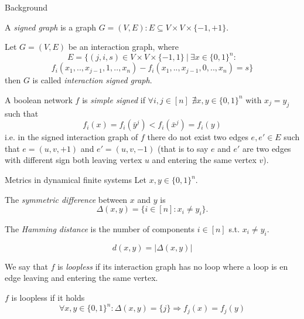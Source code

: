\documentclass{beamer}
\begin{document}
\begin{section}{Background}
\begin{frame}
    \begin{definition}
        A \textit{signed graph} is a graph $G=(V,E) : E \subseteq V \times V \times \{-1,+1\}.$
    \end{definition}
    \begin{definition}
        Let $G=(V,E)$ be an interaction graph, where
        \[
        E = \{(j,i,s) \in V \times V \times \{-1,1\}\ |\ \exists x \in \{0,1\}^n : \]\[
        f_i(x_1,..,x_{j-1}, 1,..,x_n)-f_i(x_1,..,x_{j-1}, 0,..,x_n)=s \}
        \]
        then $G$ is called \textit{interaction signed graph}.
    \end{definition}
\end{frame}

\begin{frame}
\begin{definition}
	A boolean network $f$ is \textit{simple signed} if $\forall i,j \in [n]$ $\nexists x,y \in \{0,1\}^n$ with $x_j = y_j$ such that 
	\[
	f_i(x) = f_i(\bar{y}^j) < f_i(\bar{x}^j) = f_i(y)
	\]
	i.e. in the signed interaction graph of $f$ there do not exist two edges $e,e' \in E$ such that $e = (u,v,+1)$ and $e' = (u,v,-1)$ (that is to say $e$ and $e'$ are two edges with different sign both leaving vertex $u$ and entering the same vertex $v$).
\end{definition}
\end{frame}

\begin{frame}{Metrics in dynamical finite systems}
Let $x,y \in \{0,1\}^n$.
    \begin{definition}
        The \textit{symmetric difference} between $x$ and $y$ is
        \vspace{-1em}
        \[
            \Delta (x,y) = \{ i \in [n] : x_i \neq y_i\}.
        \]
    \end{definition}
    \begin{definition}
        The \textit{Hamming distance} is the number of components $i \in [n]$ s.t. $x_i \neq y_i.$
    \end{definition}
    \begin{definition}
        \[
           d(x,y)=|\Delta(x,y)|
        \]
    \end{definition}
\end{frame}

\begin{frame}{}
    \begin{definition}[Loopless $f$]
    We say that $f$ is \textit{loopless} if its interaction graph has no loop where a loop is en edge leaving and entering the same vertex.
    \end{definition}
    \begin{definition}
    $f$ is loopless if it holds
    \[
    \forall x,y \in \{0,1\}^n : \Delta(x,y)=\{j\} \Rightarrow f_j(x) = f_j(y)
    \]
    \end{definition}
\end{frame}

\end{section}
\end{document}
